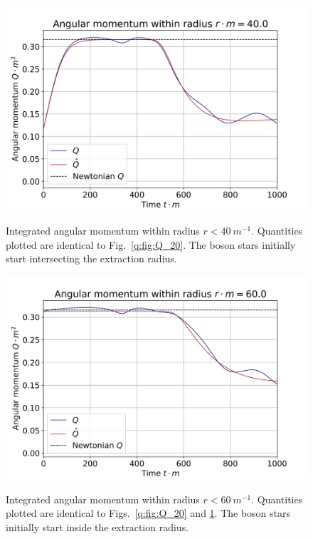 \begin{figure}[h!]
{\includegraphics[width=0.6\columnwidth]{png/Qplot_40_0.png}}
\caption{ Integrated angular momentum within radius $r<40 ~m^{-1}$. Quantities plotted are identical to Fig.~\ref{q:fig:Q_20}. The boson stars initially start intersecting the extraction radius.  }
\label{q:fig:Q_40}
\end{figure}

\begin{figure}[h!]
{\includegraphics[width=0.6\columnwidth]{png/Qplot_60_0.png}}
\caption{ Integrated angular momentum within radius $r<60 ~m^{-1}$. Quantities plotted are identical to Figs.~\ref{q:fig:Q_20} and \ref{q:fig:Q_40}. The boson stars initially start inside the extraction radius.  }
\label{q:fig:Q_60}
\end{figure}


